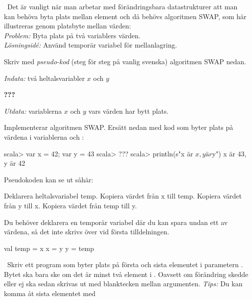 \QUESTEND







\QUESTBEGIN

\Task  \what~Det är vanligt när man arbetar med förändringsbara datastrukturer att man kan behöva byta plats mellan element och då behövs algoritmen SWAP, som här illustreras genom platsbyte mellan värden:
\\ \emph{Problem:} Byta plats på två variablers värden. \\\emph{Lösningsidé:} Använd temporär variabel för mellanlagring.

\Subtask Skriv med \emph{pseudo-kod} (steg för steg på vanlig svenska) algoritmen SWAP nedan.

\emph{Indata:} två heltalsvariabler $x$ och $y$

\textbf{???}

\emph{Utdata:} variablerna $x$ och $y$ vars värden har bytt plats.

\Subtask Implementerar algoritmen SWAP. Ersätt  nedan med kod som byter plats på värdena i variablerna  och :

\begin{REPL}
scala> var x = 42; var y = 43
scala> ???
scala> println(s"x är $x, y är $y") 
x är 43, y är 42
\end{REPL}

\SOLUTION

\TaskSolved \what

\SubtaskSolved  Pseudokoden kan se ut såhär:
\begin{Code}
Deklarera heltalsvariabel temp.
Kopiera värdet från x till temp.
Kopiera värdet från y till x.
Kopiera värdet från temp till y.
\end{Code}


\SubtaskSolved

Du behöver deklarera en temporär variabel där du kan spara undan ett av värdena, så det inte skrivs över vid första tilldelningen.

\begin{Code}
val temp = x
x = y
y = temp
\end{Code}

\QUESTEND





\QUESTBEGIN

\Task \what~Skriv ett program som byter plats på första och sista elementet i parametern . Bytet ska bara ske om det är minst två element i . Oavsett om förändring skedde eller ej ska  sedan skrivas ut med blanktecken mellan argumenten.
  \emph{Tips:} Du kan komma åt sista elementet med 

